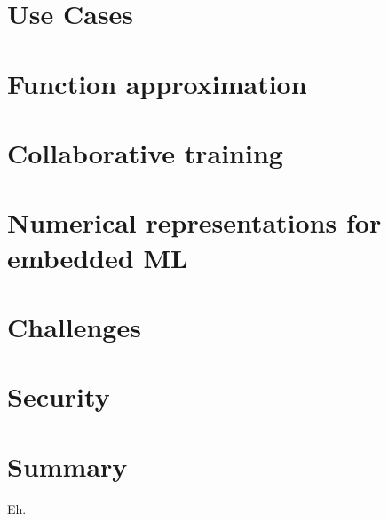 \section{Use Cases}\label{sec:use-cases}%


\section{Function approximation}\label{sec:function-approximation}


\section{Collaborative training}\label{sec:ddn-collaborative-training}


\section{Numerical representations for embedded ML}\label{sec:numerical-representations-for-embedded-ml}


\section{Challenges}\label{sec:ddn-challenges}


\section{Security}\label{sec:ddn-security}


\section{Summary}
Eh.
